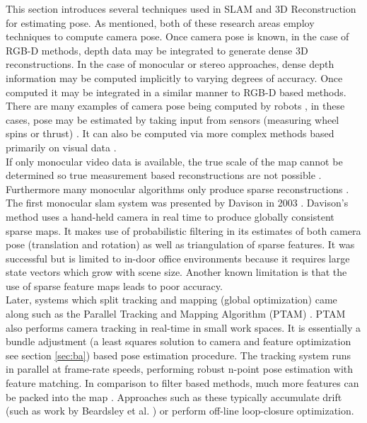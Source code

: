 
This section introduces several techniques used in SLAM and 3D Reconstruction for estimating pose. As mentioned, both of these research areas employ techniques to compute camera pose. Once camera pose is known, in the case of RGB-D methods, depth data may be integrated to generate dense 3D reconstructions. In the case of monocular or stereo approaches, dense depth information may be computed implicitly to varying degrees of accuracy. Once computed it may be integrated in a similar manner to RGB-D based methods. \\

There are many examples of camera pose being computed by robots \cite{Olson06Fast,Frese05Multilevel,Dellaert06Square,Thrun02Robotic,Nuchter056d,Grisetti07Efficient,Kaess08Isam}, in these cases, pose may be estimated by taking input from sensors (measuring wheel spins or thrust) \cite{Callieri04Roboscan}. It can also be computed via more complex methods based primarily on visual data \cite{Davison03Real,Klein07Parallel,Strasdat10Real,Jin00Real,Nister05Preemptive}. 
\\

If only monocular video data is available, the true scale of the map cannot be determined so true measurement based reconstructions are not possible \cite{Endres12Evaluation,Konolige08Outdoor, Paz08Large}. Furthermore many monocular algorithms only produce sparse reconstructions \cite{Davison03Real,Klein07Parallel}. \\

The first monocular slam system was presented by Davison in 2003 \cite{Davison03Real}. Davison's method uses a hand-held camera in real time to produce globally consistent sparse maps. It makes use of probabilistic filtering in its estimates of both camera pose (translation and rotation) as well as triangulation of sparse features. It was successful but is limited to in-door office environments because it requires large state vectors which grow with scene size. Another known limitation is that the use of sparse feature maps leads to poor accuracy. \\

Later, systems which split tracking and mapping (global optimization) came along such as the Parallel Tracking and Mapping Algorithm (PTAM) \cite{Klein07Parallel}. PTAM also performs camera tracking in real-time in small work spaces. It is essentially a bundle adjustment (a least squares solution to camera and feature optimization see section \ref{sec:ba}) based pose estimation procedure. The tracking system runs in parallel at frame-rate speeds, performing robust n-point pose estimation with feature matching. In comparison to filter based methods, much more features can be packed into the map \cite{Strasdat10Real}. Approaches such as these typically accumulate drift (such as work by Beardsley et al. \cite{Beardsley97Sequential}) or perform off-line loop-closure optimization. \\

